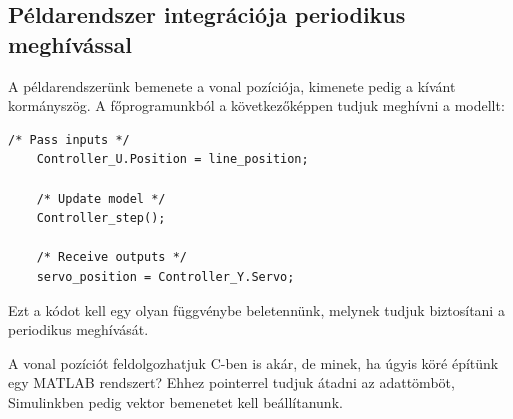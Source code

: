 \subsection{Példarendszer integrációja periodikus meghívással}

A példarendszerünk bemenete a vonal pozíciója, kimenete pedig a kívánt kormányszög. A főprogramunkból a következőképpen tudjuk meghívni a modellt:

\lstset{escapechar=@,style=customc}
\begin{lstlisting}[frame=single]
	/* Pass inputs */
	Controller_U.Position = line_position;

	/* Update model */
	Controller_step();

	/* Receive outputs */
	servo_position = Controller_Y.Servo;
\end{lstlisting}

Ezt a kódot kell egy olyan függvénybe beletennünk, melynek tudjuk biztosítani a periodikus meghívását.

A vonal pozíciót feldolgozhatjuk C-ben is akár, de minek, ha úgyis köré építünk egy MATLAB rendszert? Ehhez pointerrel tudjuk átadni az adattömböt, Simulinkben pedig vektor bemenetet kell beállítanunk.